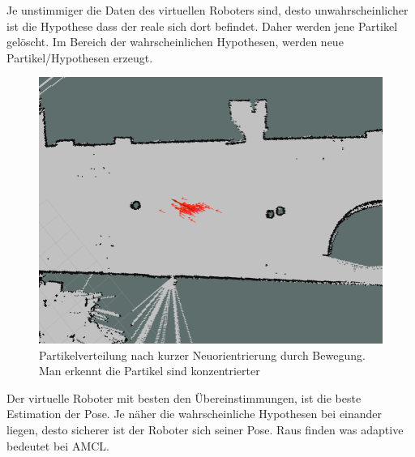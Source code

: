 \documentclass[11pt,a4paper]{article}
\begin{document}
{	Je unstimmiger die Daten des virtuellen Roboters sind, desto unwahrscheinlicher ist die Hypothese dass der reale sich dort befindet. Daher werden jene Partikel gel\"oscht. Im Bereich der wahrscheinlichen Hypothesen, werden neue Partikel/Hypothesen erzeugt.
	
\begin{figure}[h]
	\includegraphics[width=\linewidth]{pictures/drive_little.jpg}
	\caption{Partikelverteilung nach kurzer Neuorientrierung durch Bewegung. Man erkennt die Partikel sind konzentrierter}
\end{figure}
		
	Der virtuelle Roboter  mit besten den \"Ubereinstimmungen, ist die beste Estimation der Pose.
	Je n\"aher die wahrscheinliche Hypothesen bei einander liegen, desto sicherer ist der Roboter sich seiner Pose. Raus finden was adaptive bedeutet bei AMCL.		
}
\newpage
\end{document}

